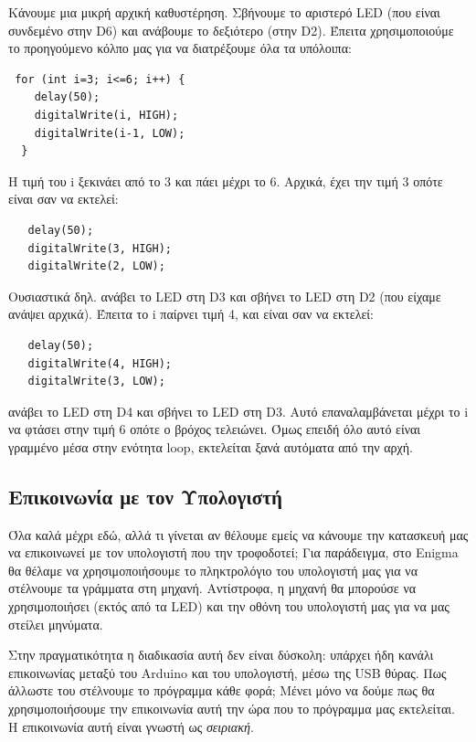 \documentclass[a4paper,twoside,12pt]{article}
\begin{document}
Κάνουμε μια μικρή αρχική καθυστέρηση. Σβήνουμε το αριστερό LED (που είναι συνδεμένο στην D6) και ανάβουμε το δεξιότερο (στην D2). Έπειτα χρησιμοποιούμε το προηγούμενο κόλπο μας για να διατρέξουμε όλα τα υπόλοιπα:

\begin{verbatim}
 for (int i=3; i<=6; i++) {
    delay(50);
    digitalWrite(i, HIGH);
    digitalWrite(i-1, LOW);
  }
\end{verbatim}

Η τιμή του i ξεκινάει από το 3 και πάει μέχρι το 6. Αρχικά, έχει την τιμή 3 οπότε είναι σαν να εκτελεί:

\begin{verbatim}
   delay(50);
   digitalWrite(3, HIGH);
   digitalWrite(2, LOW);
\end{verbatim}

Ουσιαστικά δηλ. ανάβει το LED στη D3 και σβήνει το LED στη D2 (που είχαμε ανάψει αρχικά). Έπειτα το i παίρνει τιμή 4, και είναι σαν να εκτελεί:

\begin{verbatim}
   delay(50);
   digitalWrite(4, HIGH);
   digitalWrite(3, LOW);
\end{verbatim}

ανάβει το LED στη D4 και σβήνει το LED στη D3. Αυτό επαναλαμβάνεται μέχρι το i να φτάσει στην τιμή 6 οπότε ο βρόχος τελειώνει. Όμως επειδή όλο αυτό είναι γραμμένο μέσα στην ενότητα loop, εκτελείται ξανά αυτόματα από την αρχή.

\subsection{Επικοινωνία με τον Υπολογιστή}

Όλα καλά μέχρι εδώ, αλλά τι γίνεται αν θέλουμε εμείς να κάνουμε την κατασκευή μας να επικοινωνεί με τον υπολογιστή που την τροφοδοτεί; Για παράδειγμα, στο Enigma θα θέλαμε να χρησιμοποιήσουμε το πληκτρολόγιο του υπολογιστή μας για να στέλνουμε τα γράμματα στη μηχανή. Αντίστροφα, η μηχανή θα μπορούσε να χρησιμοποιήσει (εκτός από τα LED) και την οθόνη του υπολογιστή μας για να μας στείλει μηνύματα. 

Στην πραγματικότητα η διαδικασία αυτή δεν είναι δύσκολη: υπάρχει ήδη κανάλι επικοινωνίας μεταξύ του Arduino και του υπολογιστή, μέσω της USB θύρας. Πως άλλωστε του στέλνουμε το πρόγραμμα κάθε φορά; Μένει μόνο να δούμε πως θα χρησιμοποιήσουμε την επικοινωνία αυτή την ώρα που το πρόγραμμα μας εκτελείται.  Η επικοινωνία αυτή είναι γνωστή ως \emph{σειριακή}.
\end{document}
